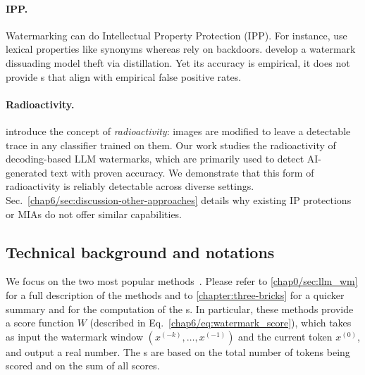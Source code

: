 \vspace{-0.5em}\paragraph{IPP.} Watermarking can do Intellectual Property Protection (IPP). 
For instance, \citet{he2022cater,he2022protecting,li2023protecting} use lexical properties like synonyms whereas \citet{peng2023you} rely on backdoors. 
\citet{zhao2023protecting} develop a watermark dissuading model theft via distillation.
Yet its accuracy is empirical, it does not provide \pval s that align with empirical false positive rates.

\vspace{-0.5em}\paragraph{Radioactivity.}
\citet{sablayrolles2020radioactive} introduce the concept of \emph{radioactivity}: images are modified to leave a detectable trace in any classifier trained on them.
Our work studies the radioactivity of decoding-based LLM watermarks, which are primarily used to detect AI-generated text with proven accuracy.
We demonstrate that this form of radioactivity is reliably detectable across diverse settings.
Sec.~\ref{chap6/sec:discussion-other-approaches} details why existing IP protections or MIAs do not offer similar capabilities.





\subsection{Technical background and notations}\label{chap6:sec:llm_watermarking}

We focus on the two most popular methods~\citep{aaronson2023watermarking, kirchenbauer2023watermark}.
Please refer to \autoref{chap0/sec:llm_wm} for a full description of the methods and to \autoref{chapter:three-bricks} for a quicker summary and for the computation of the \pval s.
In particular, these methods provide a score function $W$ (described in Eq.~\ref{chap6/eq:watermark_score}), which takes as input the watermark window $(x^{(-k)},\dots, x^{(-1)} )$ and the current token $x^{(0)}$, and output a real number. 
The \pval s are based on the total number of tokens being scored and on the sum of all scores.






